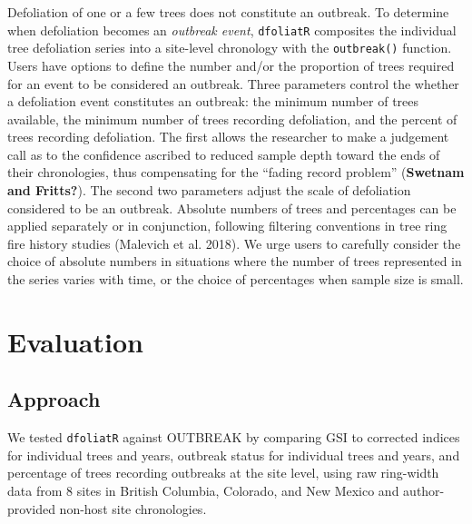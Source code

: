 \documentclass[review]{elsarticle} %
\begin{document}
Defoliation of one or a few trees does not constitute an outbreak. To
determine when defoliation becomes an \emph{outbreak event},
\texttt{dfoliatR} composites the individual tree defoliation series into
a site-level chronology with the \texttt{outbreak()} function. Users
have options to define the number and/or the proportion of trees
required for an event to be considered an outbreak. Three parameters
control the whether a defoliation event constitutes an outbreak: the
minimum number of trees available, the minimum number of trees recording
defoliation, and the percent of trees recording defoliation. The first
allows the researcher to make a judgement call as to the confidence
ascribed to reduced sample depth toward the ends of their chronologies,
thus compensating for the ``fading record problem'' (\textbf{Swetnam and
Fritts?}). The second two parameters adjust the scale of defoliation
considered to be an outbreak. Absolute numbers of trees and percentages
can be applied separately or in conjunction, following filtering
conventions in tree ring fire history studies (Malevich et al. 2018). We
urge users to carefully consider the choice of absolute numbers in
situations where the number of trees represented in the series varies
with time, or the choice of percentages when sample size is small.

\hypertarget{evaluation}{%
\section{Evaluation}\label{evaluation}}

\hypertarget{approach}{%
\subsection{Approach}\label{approach}}

We tested \texttt{dfoliatR} against OUTBREAK by comparing GSI to
corrected indices for individual trees and years, outbreak status for
individual trees and years, and percentage of trees recording outbreaks
at the site level, using raw ring-width data from 8 sites in British
Columbia, Colorado, and New Mexico and author-provided non-host site
chronologies.
\end{document}
